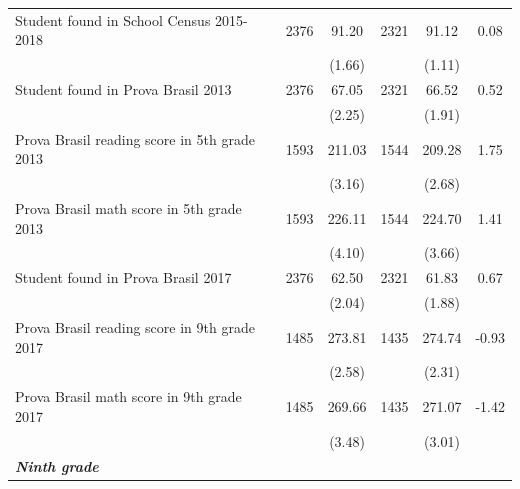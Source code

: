 \documentclass[
	article,			%
	12pt,				%
	oneside,			%
	a4paper,			%
	]{article}
\begin{document}
\begin{table}[h!]
\begin{threeparttable}
\begin{tabular*}{\textwidth}{@{\extracolsep{\fill}}lccccc@{}}
Student found in School Census 2015-2018 &       2376 &      91.20 &       2321 &      91.12 &       0.08 \\

           &            &     (1.66) &            &     (1.11) &            \\

Student found in Prova Brasil 2013 &       2376 &      67.05 &       2321 &      66.52 &       0.52 \\

           &            &     (2.25) &            &     (1.91) &            \\

Prova Brasil reading score in 5th grade 2013 &       1593 &     211.03 &       1544 &     209.28 &       1.75 \\

           &            &     (3.16) &            &     (2.68) &            \\

Prova Brasil math score in 5th grade 2013 &       1593 &     226.11 &       1544 &     224.70 &       1.41 \\

           &            &     (4.10) &            &     (3.66) &            \\

Student found in Prova Brasil 2017 &       2376 &      62.50 &       2321 &      61.83 &       0.67 \\

           &            &     (2.04) &            &     (1.88) &            \\

Prova Brasil reading score in 9th grade 2017 &       1485 &     273.81 &       1435 &     274.74 &      -0.93 \\

           &            &     (2.58) &            &     (2.31) &            \\

Prova Brasil math score in 9th grade 2017 &       1485 &     269.66 &       1435 &     271.07 &      -1.42 \\

           &            &     (3.48) &            &     (3.01) &            \\

{\it {\bf Ninth grade}} &            &            &            &            &            \\


\end{tabular*}
\end{threeparttable}
\end{table}
\end{document}
